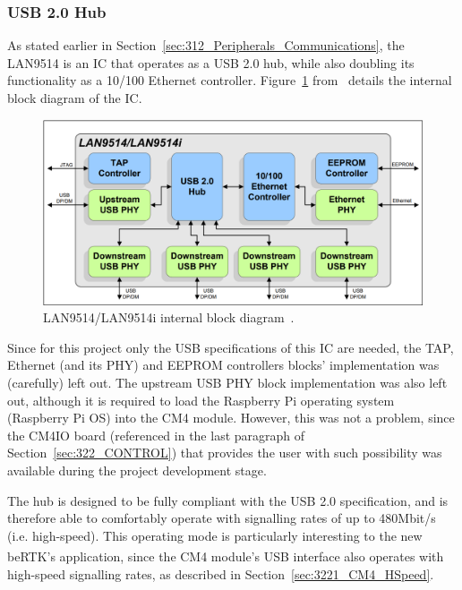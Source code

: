 
\subsubsection{USB 2.0 Hub}\label{sec:3234_LAN9514}

As stated earlier in Section~\ref{sec:312_Peripherals_Communications}, the LAN9514 is an IC that operates as a USB 2.0 hub, while also doubling its functionality as a 10/100 Ethernet controller. Figure~\ref{fig:LAN9514_blockDiagram} from~\cite{LAN9514} details the internal block diagram of the IC. 

\begin{figure}[h]
	\centering
	\includegraphics[width=1.0\textwidth]{Chapters/Figures/chapter3/LAN9514_blockDiagram.png}
	\caption{LAN9514/LAN9514i internal block diagram~\cite{LAN9514}.}
	\label{fig:LAN9514_blockDiagram}
\end{figure}

Since for this project only the USB specifications of this IC are needed, the TAP, Ethernet (and its PHY) and EEPROM controllers blocks' implementation was (carefully) left out. The upstream USB PHY block implementation was also left out, although it is required to load the Raspberry Pi operating system (Raspberry Pi OS) into the CM4 module. However, this was not a problem, since the CM4IO board (referenced in the last paragraph of Section~\ref{sec:322_CONTROL}) that provides the user with such possibility was available during the project development stage.

The hub is designed to be fully compliant with the USB 2.0 specification, and is therefore able to comfortably operate with signalling rates of up to 480Mbit/s (i.e. high-speed). This operating mode is particularly interesting to the new beRTK\textsuperscript{\textregistered}'s application, since the CM4 module's USB interface also operates with high-speed signalling rates, as described in Section~\ref{sec:3221_CM4_HSpeed}.

